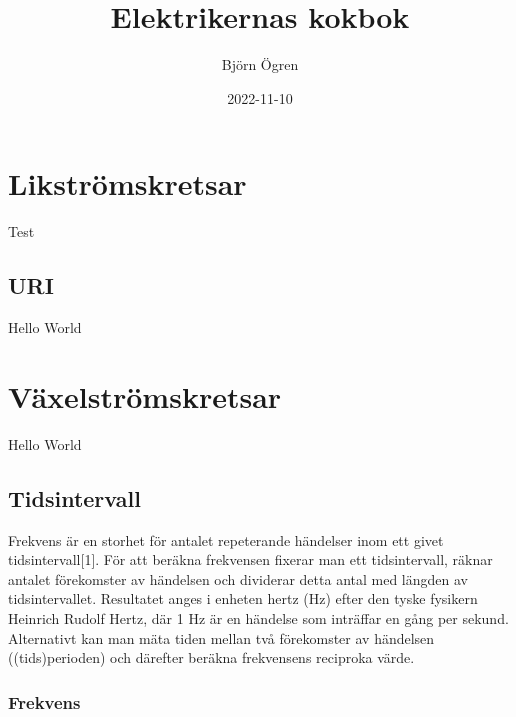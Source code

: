 \documentclass[
]{book}
\title{Elektrikernas kokbok}
\author{Björn Ögren}
\date{2022-11-10}
\begin{document}
\maketitle

{
\setcounter{tocdepth}{1}
\tableofcontents
}
\hypertarget{likstruxf6mskretsar}{%
\chapter{Likströmskretsar}\label{likstruxf6mskretsar}}

Test

\hypertarget{uri}{%
\section{URI}\label{uri}}

Hello World

\hypertarget{vuxe4xelstruxf6mskretsar}{%
\chapter{Växelströmskretsar}\label{vuxe4xelstruxf6mskretsar}}

Hello World

\hypertarget{tidsintervall}{%
\section{Tidsintervall}\label{tidsintervall}}

Frekvens är en storhet för antalet
repeterande händelser inom ett givet
tidsintervall{[}1{]}. För att beräkna
frekvensen fixerar man ett
tidsintervall, räknar antalet
förekomster av händelsen och
dividerar detta antal med längden av
tidsintervallet. Resultatet anges i
enheten hertz (Hz) efter den tyske
fysikern Heinrich Rudolf Hertz, där
1 Hz är en händelse som inträffar en
gång per sekund. Alternativt kan man
mäta tiden mellan två förekomster av
händelsen ((tids)perioden) och
därefter beräkna frekvensens
reciproka värde.

\hypertarget{frekvens}{%
\subsection{Frekvens}\label{frekvens}}
\end{document}
